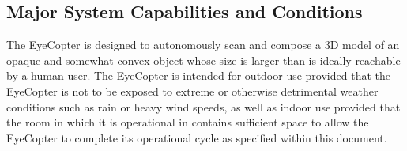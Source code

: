 \documentclass[10pt,letterpaper]{article}
\begin{document}
\subsection{Major System Capabilities and Conditions}
The EyeCopter is designed to autonomously scan and compose a 3D model of an opaque and somewhat convex object whose size is larger than is ideally reachable by a human user. The EyeCopter is intended for outdoor use provided that the EyeCopter is not to be exposed to extreme or otherwise detrimental weather conditions such as rain or heavy wind speeds, as well as indoor use provided that the room in which it is operational in contains sufficient space to allow the EyeCopter to complete its operational cycle as specified within this document.

\end{document}
